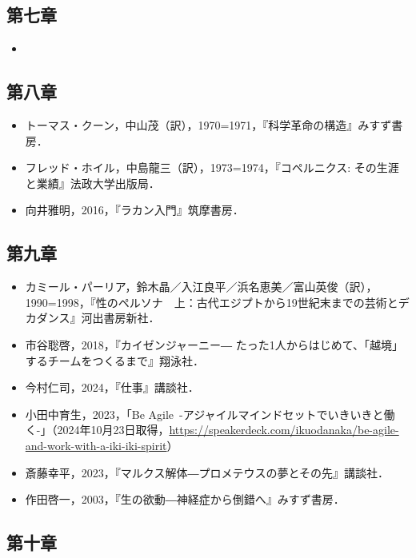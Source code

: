 \subsection{第七章}\label{ux7b2cux4e03ux7ae0}

\begin{itemize}
\tightlist
\item
\end{itemize}

\subsection{第八章}\label{ux7b2cux516bux7ae0}

\begin{itemize}
\tightlist
\item
  トーマス・クーン，中山茂（訳），1970=1971，『科学革命の構造』みすず書房．
\item
  フレッド・ホイル，中島龍三（訳），1973=1974，『コペルニクス:
  その生涯と業績』法政大学出版局．
\item
  向井雅明，2016，『ラカン入門』筑摩書房．
\end{itemize}

\subsection{第九章}\label{ux7b2cux4e5dux7ae0}

\begin{itemize}
\tightlist
\item
  カミール・パーリア，鈴木晶／入江良平／浜名恵美／富山英俊（訳），1990=1998，『性のペルソナ　上：古代エジプトから19世紀末までの芸術とデカダンス』河出書房新社．
\item
  市谷聡啓，2018，『カイゼンジャーニー―
  たった1人からはじめて、「越境」するチームをつくるまで』翔泳社．
\item
  今村仁司，2024，『仕事』講談社．
\item
  小田中育生，2023，「Be
  Agile~-アジャイルマインドセットでいきいきと働く-」（2024年10月23日取得，\url{https://speakerdeck.com/ikuodanaka/be-agile-and-work-with-a-iki-iki-spirit}）
\item
  斎藤幸平，2023，『マルクス解体―プロメテウスの夢とその先』講談社．
\item
  作田啓一，2003，『生の欲動―神経症から倒錯へ』みすず書房．
\end{itemize}

\subsection{第十章}\label{ux7b2cux5341ux7ae0}

